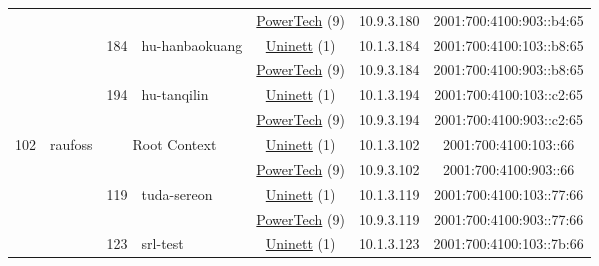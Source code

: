 \begin{small}
\begin{center}
\begin{longtable}{|c|c|c|c|c|c|c|c|}
  &  &  &  & \multicolumn{2}{|c|}{\tiny{\href{http://www.powertech.no}{PowerTech} (9)}} & \tiny{10.9.3.180} & \tiny{2001:700:4100:903::b4:65} \\* \cline{3-3}\cline{4-4}\cline{5-5}\cline{6-6}\cline{7-7}\cline{8-8}
  &  & \multirow{2}{*}{\tiny{184}} & \multicolumn{1}{|l|}{\multirow{2}{*}{\tiny{hu-hanbaokuang}}} & \multicolumn{2}{|c|}{\tiny{\href{https://www.uninett.no}{Uninett} (1)}} & \tiny{10.1.3.184} & \tiny{2001:700:4100:103::b8:65} \\* \cline{5-5}\cline{6-6}\cline{7-7}\cline{8-8}
  &  &  &  & \multicolumn{2}{|c|}{\tiny{\href{http://www.powertech.no}{PowerTech} (9)}} & \tiny{10.9.3.184} & \tiny{2001:700:4100:903::b8:65} \\* \cline{3-3}\cline{4-4}\cline{5-5}\cline{6-6}\cline{7-7}\cline{8-8}
  &  & \multirow{2}{*}{\tiny{194}} & \multicolumn{1}{|l|}{\multirow{2}{*}{\tiny{hu-tanqilin}}} & \multicolumn{2}{|c|}{\tiny{\href{https://www.uninett.no}{Uninett} (1)}} & \tiny{10.1.3.194} & \tiny{2001:700:4100:103::c2:65} \\* \cline{5-5}\cline{6-6}\cline{7-7}\cline{8-8}
  &  &  &  & \multicolumn{2}{|c|}{\tiny{\href{http://www.powertech.no}{PowerTech} (9)}} & \tiny{10.9.3.194} & \tiny{2001:700:4100:903::c2:65} \\ \hline
 \multirow{24}{*}{\tiny{102}} & \multicolumn{1}{|l|}{\multirow{24}{*}{\tiny{raufoss}}} & \multicolumn{2}{|c|}{\multirow{2}{*}{\tiny{Root Context}}} & \multicolumn{2}{|c|}{\tiny{\href{https://www.uninett.no}{Uninett} (1)}} & \tiny{10.1.3.102} & \tiny{2001:700:4100:103::66} \\* \cline{5-5}\cline{6-6}\cline{7-7}\cline{8-8}
  &  & \multicolumn{2}{|c|}{} & \multicolumn{2}{|c|}{\tiny{\href{http://www.powertech.no}{PowerTech} (9)}} & \tiny{10.9.3.102} & \tiny{2001:700:4100:903::66} \\* \cline{3-3}\cline{4-4}\cline{5-5}\cline{6-6}\cline{7-7}\cline{8-8}
  &  & \multirow{2}{*}{\tiny{119}} & \multicolumn{1}{|l|}{\multirow{2}{*}{\tiny{tuda-sereon}}} & \multicolumn{2}{|c|}{\tiny{\href{https://www.uninett.no}{Uninett} (1)}} & \tiny{10.1.3.119} & \tiny{2001:700:4100:103::77:66} \\* \cline{5-5}\cline{6-6}\cline{7-7}\cline{8-8}
  &  &  &  & \multicolumn{2}{|c|}{\tiny{\href{http://www.powertech.no}{PowerTech} (9)}} & \tiny{10.9.3.119} & \tiny{2001:700:4100:903::77:66} \\* \cline{3-3}\cline{4-4}\cline{5-5}\cline{6-6}\cline{7-7}\cline{8-8}
  &  & \multirow{2}{*}{\tiny{123}} & \multicolumn{1}{|l|}{\multirow{2}{*}{\tiny{srl-test}}} & \multicolumn{2}{|c|}{\tiny{\href{https://www.uninett.no}{Uninett} (1)}} & \tiny{10.1.3.123} & \tiny{2001:700:4100:103::7b:66} \\* \cline{5-5}\cline{6-6}\cline{7-7}\cline{8-8}

\end{longtable}
\end{center}
\end{small}
